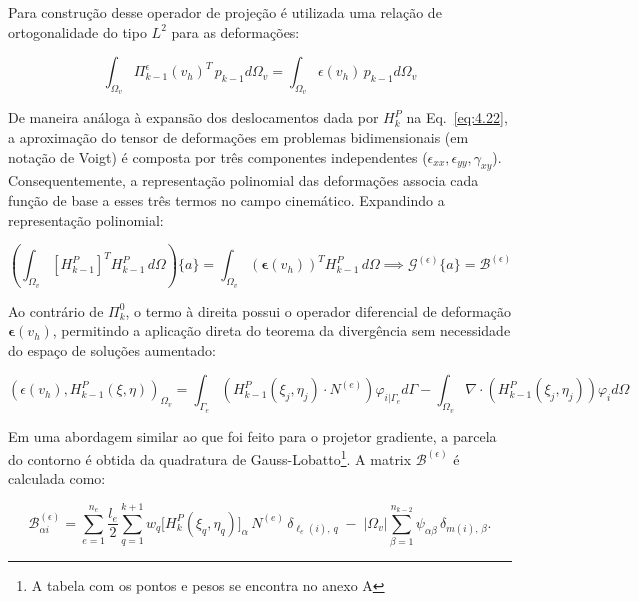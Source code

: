     \indent Para construção desse operador de projeção é utilizada uma relação de ortogonalidade do tipo $L^2$ para as deformações:
    
    \begin{equation}
        \int_{\Omega_v} \Pi_{k-1}^\epsilon(v_h)^T \, p_{k-1} d\Omega_v = \int_{\Omega_v} \epsilon{(v_h)} \,p_{k-1} d\Omega_v 
        \label{eq:4.46}
    \end{equation}

    \indent De maneira análoga à expansão dos deslocamentos dada por $H_k^P$ na Eq.~\ref{eq:4.22}, a aproximação do tensor de deformações em problemas bidimensionais (em notação de Voigt) é composta por três componentes independentes ($\epsilon_{xx}, \epsilon_{yy}, \gamma_{xy}$). Consequentemente, a representação polinomial das deformações associa cada função de base a esses três termos no campo cinemático. Expandindo a representação polinomial:  
    
    \begin{equation}
        \left( \int_{\Omega_v} [H_{k-1}^P]^T H_{k-1}^P \, d\Omega \right) \{a\} = \int_{\Omega_v} (\boldsymbol{\epsilon}(v_h))^T H_{k-1}^P \, d\Omega \implies \mathcal{G}^{(\epsilon)} \{a\} = \mathcal{B}^{(\epsilon)} 
        \label{eq:4.47}
    \end{equation}

    \indent Ao contrário de $\Pi_k^0$, o termo à direita possui o operador diferencial de deformação $\boldsymbol{\epsilon}(v_h)$, permitindo a aplicação direta do teorema da divergência sem necessidade do espaço de soluções aumentado: 
    
    \begin{equation}
        (\epsilon{(v_h)},H_{k-1}^P(\xi,\eta))_{\Omega_v} = \int_{\Gamma_e} \left(H_{k-1}^P(\xi_j,\eta_j) \cdot N^{(e)} \right) \varphi_{i\vert{}\Gamma_e} d\Gamma - \int_{\Omega_v} \nabla \cdot (H_{k-1}^P(\xi_j,\eta_j)) \varphi_i d\Omega 
        \label{eq:4.48}
    \end{equation}
	
    \indent Em uma abordagem similar ao que foi feito para o projetor gradiente, a parcela do contorno é obtida da quadratura de Gauss-Lobatto\footnote{A tabela com os pontos e pesos se encontra no anexo A}. A matrix $\mathcal{B}^{(\epsilon)}$ é calculada como:

    \begin{equation}
        \mathcal{B}^{(\epsilon)}_{\alpha i} = \sum_{e=1}^{n_e}\frac{l_e}{2}\sum_{q=1}^{k+1}w_q \bigl[H_k^P(\xi_q,\eta_q)\bigr]_{\alpha}\,N^{(e)}\, \delta_{\ell_e(i),\,q}\;-\; |\Omega_v|\sum_{\beta=1}^{n_{k-2}} \psi_{\alpha\beta}\, \delta_{m(i),\,\beta}.
        \label{eq:4.49}
    \end{equation}

